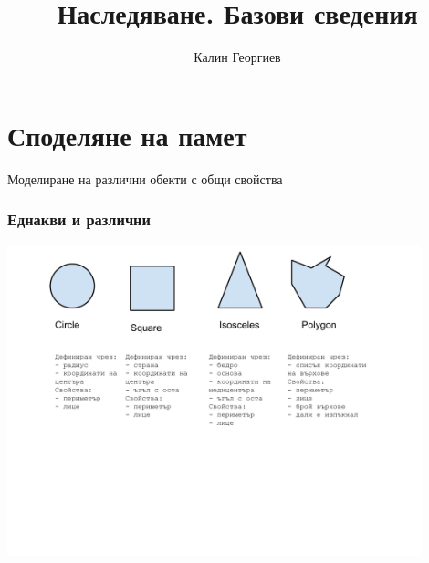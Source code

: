 \documentclass{beamer}
\begin{document}
\title[Обектно ориентирано програмиране]{Наследяване. Базови сведения}
\author{Калин Георгиев}
\frame{\titlepage}

\section{Споделяне на памет}


\begin{frame}
\centerline{Моделиране на различни обекти с общи свойства}
\end{frame}


\begin{frame}[fragile]
\frametitle{Еднакви и различни}

\begin{center}
\includegraphics[width=12.0cm]{images/figures}
\end{center}


\end{frame}
\end{document}
